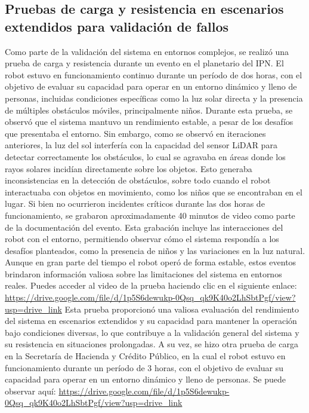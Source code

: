\subsection{Pruebas de carga y resistencia en escenarios extendidos para validaci\'on de fallos}
\label{sub:PruebasDeCarga02}
    Como parte de la validaci\'on del sistema en entornos complejos, se realiz\'o una prueba de carga  
        y resistencia durante un evento en el planetario del IPN. El robot estuvo en funcionamiento 
        continuo durante un per\'iodo de dos horas, con el objetivo de evaluar su capacidad para operar 
        en un entorno din\'amico y lleno de personas, incluidas condiciones espec\'ificas como la luz solar 
        directa y la presencia de m\'ultiples obst\'aculos m\'oviles, principalmente ni\~nos.
    \vskip 0.5cm
    Durante esta prueba, se observ\'o que el sistema mantuvo un rendimiento estable, a pesar de los desaf\'ios 
        que presentaba el entorno. Sin embargo, como se observ\'o en iteraciones anteriores, la luz del 
        sol interfer\'ia con la capacidad del sensor LiDAR para detectar correctamente los obst\'aculos, 
        lo cual se agravaba en \'areas donde los rayos solares incid\'ian directamente sobre los objetos. 
        Esto generaba inconsistencias en la detecci\'on de obst\'aculos, sobre todo cuando el robot interactuaba 
        con objetos en movimiento, como los ni\~nos que se encontraban en el lugar.
    \vskip 0.5cm
    Si bien no ocurrieron incidentes cr\'iticos durante las dos horas de funcionamiento, se grabaron aproximadamente 
        40 minutos de video como parte de la documentaci\'on del evento. Esta grabaci\'on incluye las interacciones 
        del robot con el entorno, permitiendo observar c\'omo el sistema respond\'ia a los desaf\'ios planteados, como 
        la presencia de ni\~nos y las variaciones en la luz natural. Aunque en gran parte del tiempo el robot oper\'o 
        de forma estable, estos eventos brindaron informaci\'on valiosa sobre las limitaciones del sistema en entornos reales.
    \vskip 0.5cm
    Puedes acceder al video de la prueba haciendo clic en el siguiente enlace: \url{https://drive.google.com/file/d/1p5S6dewukp-0Qsq_qk9K40o2LhSbtPgf/view?usp=drive_link}
    \vskip 0.5cm
    Esta prueba proporcion\'o una valiosa evaluaci\'on del rendimiento del sistema en escenarios extendidos y su 
        capacidad para mantener la operaci\'on bajo condiciones diversas, lo que contribuye a la validaci\'on general 
        del sistema y su resistencia en situaciones prolongadas.
    \vskip 0.5cm
    A su vez, se hizo otra prueba de carga en la Secretar\'ia de Hacienda y Cr\'edito P\'ublico, en la cual el robot 
        estuvo en funcionamiento durante un per\'iodo de 3 horas, con el objetivo de evaluar su capacidad para operar 
        en un entorno din\'amico y lleno de personas. Se puede observar aqu\'i: \url{https://drive.google.com/file/d/1p5S6dewukp-0Qsq_qk9K40o2LhSbtPgf/view?usp=drive_link}
